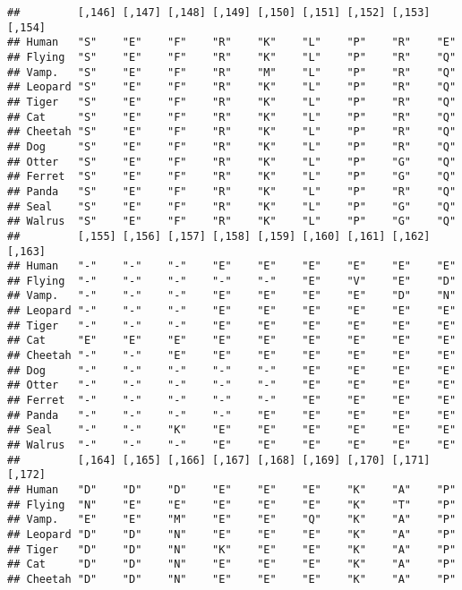 \documentclass[]{article}
\begin{document}
\begin{verbatim}
##         [,146] [,147] [,148] [,149] [,150] [,151] [,152] [,153] [,154]
## Human   "S"    "E"    "F"    "R"    "K"    "L"    "P"    "R"    "E"   
## Flying  "S"    "E"    "F"    "R"    "K"    "L"    "P"    "R"    "Q"   
## Vamp.   "S"    "E"    "F"    "R"    "M"    "L"    "P"    "R"    "Q"   
## Leopard "S"    "E"    "F"    "R"    "K"    "L"    "P"    "R"    "Q"   
## Tiger   "S"    "E"    "F"    "R"    "K"    "L"    "P"    "R"    "Q"   
## Cat     "S"    "E"    "F"    "R"    "K"    "L"    "P"    "R"    "Q"   
## Cheetah "S"    "E"    "F"    "R"    "K"    "L"    "P"    "R"    "Q"   
## Dog     "S"    "E"    "F"    "R"    "K"    "L"    "P"    "R"    "Q"   
## Otter   "S"    "E"    "F"    "R"    "K"    "L"    "P"    "G"    "Q"   
## Ferret  "S"    "E"    "F"    "R"    "K"    "L"    "P"    "G"    "Q"   
## Panda   "S"    "E"    "F"    "R"    "K"    "L"    "P"    "R"    "Q"   
## Seal    "S"    "E"    "F"    "R"    "K"    "L"    "P"    "G"    "Q"   
## Walrus  "S"    "E"    "F"    "R"    "K"    "L"    "P"    "G"    "Q"   
##         [,155] [,156] [,157] [,158] [,159] [,160] [,161] [,162] [,163]
## Human   "-"    "-"    "-"    "E"    "E"    "E"    "E"    "E"    "E"   
## Flying  "-"    "-"    "-"    "-"    "-"    "E"    "V"    "E"    "D"   
## Vamp.   "-"    "-"    "-"    "E"    "E"    "E"    "E"    "D"    "N"   
## Leopard "-"    "-"    "-"    "E"    "E"    "E"    "E"    "E"    "E"   
## Tiger   "-"    "-"    "-"    "E"    "E"    "E"    "E"    "E"    "E"   
## Cat     "E"    "E"    "E"    "E"    "E"    "E"    "E"    "E"    "E"   
## Cheetah "-"    "-"    "E"    "E"    "E"    "E"    "E"    "E"    "E"   
## Dog     "-"    "-"    "-"    "-"    "-"    "E"    "E"    "E"    "E"   
## Otter   "-"    "-"    "-"    "-"    "-"    "E"    "E"    "E"    "E"   
## Ferret  "-"    "-"    "-"    "-"    "-"    "E"    "E"    "E"    "E"   
## Panda   "-"    "-"    "-"    "-"    "E"    "E"    "E"    "E"    "E"   
## Seal    "-"    "-"    "K"    "E"    "E"    "E"    "E"    "E"    "E"   
## Walrus  "-"    "-"    "-"    "E"    "E"    "E"    "E"    "E"    "E"   
##         [,164] [,165] [,166] [,167] [,168] [,169] [,170] [,171] [,172]
## Human   "D"    "D"    "D"    "E"    "E"    "E"    "K"    "A"    "P"   
## Flying  "N"    "E"    "E"    "E"    "E"    "E"    "K"    "T"    "P"   
## Vamp.   "E"    "E"    "M"    "E"    "E"    "Q"    "K"    "A"    "P"   
## Leopard "D"    "D"    "N"    "E"    "E"    "E"    "K"    "A"    "P"   
## Tiger   "D"    "D"    "N"    "K"    "E"    "E"    "K"    "A"    "P"   
## Cat     "D"    "D"    "N"    "E"    "E"    "E"    "K"    "A"    "P"   
## Cheetah "D"    "D"    "N"    "E"    "E"    "E"    "K"    "A"    "P"   

\end{verbatim}
\end{document}
